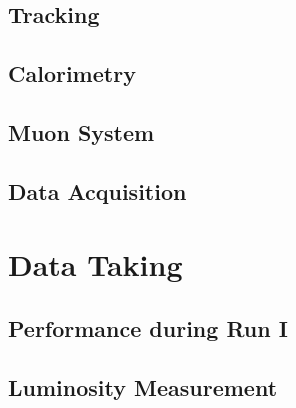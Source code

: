 


\subsection{Tracking}

\subsection{Calorimetry}

\subsection{Muon System}

\subsection{Data Acquisition}




\section{Data Taking}
\subsection{Performance during Run I}

\subsection{Luminosity Measurement}


\printbibliography